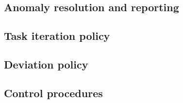 \subsection{Anomaly resolution and reporting} \label{s:details-of-the-master-test-plan:anomaly-resolution-and-reporting}
	\begin{comment}
		$<$ Describe the method of reporting and resolving anomalies, including the standards for reporting an anomaly, the Anomaly Report distribution list, and the authority and time line for resolving anomalies. This section of the plan defines the anomaly criticality levels. Classification for software anomalies may be found in IEEE Std 1044TM-1993. $>$
	\end{comment}

\subsection{Task iteration policy} \label{s:details-of-the-master-test-plan:task-iteration-policy}
	\begin{comment}
		$<$ Describe the criteria used to determine the extent to which a testing task is repeated when its input is changed or task procedure is changed (e.g., reexecuting tests after anomalies have been fixed). These criteria may include assessments of change, integrity level, and effects on budget, schedule, and quality. $>$
	\end{comment}

\subsection{Deviation policy} \label{s:details-of-the-master-test-plan:deviation-policy}
	\begin{comment}
		$<$ Describe the procedures and criteria used to deviate from the MTP and level test documentation after they are developed. The information required for deviations includes task identification, rationale, and effect on system/software quality. Identify the authorities responsible for approving deviations. $>$
	\end{comment}

\subsection{Control procedures} \label{s:details-of-the-master-test-plan:control-procedures}
	\begin{comment}
		$<$ Identify control procedures applied to the test activities. These procedures describe how the softwarebased system and software products and test results will be configured, protected, and stored.\\
		These procedures may describe quality assurance, configuration management, data management, or other activities if they are not addressed by other efforts. Describe how the test activities comply with existing security provisions and how the test results are to be protected from unauthorized alterations. $>$
	\end{comment}

